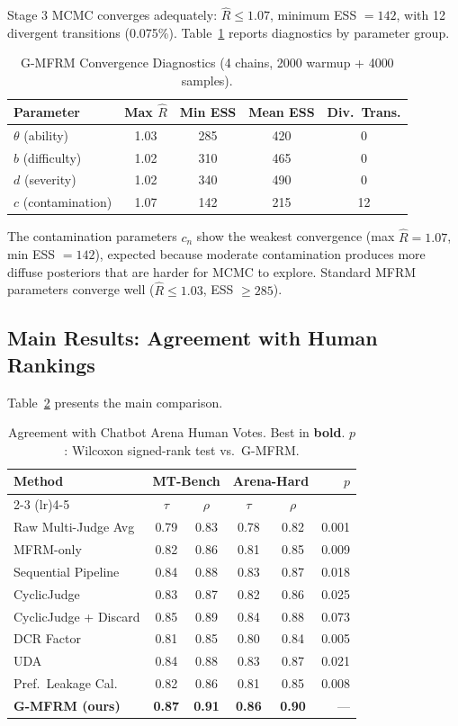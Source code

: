 \documentclass[11pt]{article}
\newcommand{\gmfrm}{G-MFRM}
\newcommand{\cn}{c_n}
\begin{document}
Stage 3 MCMC converges adequately: $\hat{R} \leq 1.07$, minimum ESS $= 142$, with 12 divergent transitions (0.075\%).
Table~\ref{tab:convergence} reports diagnostics by parameter group.

\begin{table}[t]
\centering
\caption{G-MFRM Convergence Diagnostics (4 chains, 2000 warmup + 4000 samples).}
\label{tab:convergence}
\begin{tabular}{lcccc}
\toprule
Parameter & Max $\hat{R}$ & Min ESS & Mean ESS & Div.\ Trans. \\
\midrule
$\theta$ (ability) & 1.03 & 285 & 420 & 0 \\
$b$ (difficulty) & 1.02 & 310 & 465 & 0 \\
$d$ (severity) & 1.02 & 340 & 490 & 0 \\
$c$ (contamination) & 1.07 & 142 & 215 & 12 \\
\bottomrule
\end{tabular}
\end{table}

The contamination parameters $\cn$ show the weakest convergence (max $\hat{R} = 1.07$, min ESS $= 142$), expected because moderate contamination produces more diffuse posteriors that are harder for MCMC to explore.
Standard MFRM parameters converge well ($\hat{R} \leq 1.03$, ESS $\geq 285$).

\subsection{Main Results: Agreement with Human Rankings}

Table~\ref{tab:main_results} presents the main comparison.

\begin{table}[t]
\centering
\caption{Agreement with Chatbot Arena Human Votes. Best in \textbf{bold}. $p$: Wilcoxon signed-rank test vs.\ \gmfrm{}.}
\label{tab:main_results}
\small
\begin{tabular}{lccccr}
\toprule
Method & \multicolumn{2}{c}{MT-Bench} & \multicolumn{2}{c}{Arena-Hard} & $p$ \\
\cmidrule(lr){2-3} \cmidrule(lr){4-5}
 & $\tau$ & $\rho$ & $\tau$ & $\rho$ & \\
\midrule
Raw Multi-Judge Avg & 0.79 & 0.83 & 0.78 & 0.82 & 0.001 \\
MFRM-only & 0.82 & 0.86 & 0.81 & 0.85 & 0.009 \\
Sequential Pipeline & 0.84 & 0.88 & 0.83 & 0.87 & 0.018 \\
CyclicJudge & 0.83 & 0.87 & 0.82 & 0.86 & 0.025 \\
CyclicJudge + Discard & 0.85 & 0.89 & 0.84 & 0.88 & 0.073 \\
DCR Factor & 0.81 & 0.85 & 0.80 & 0.84 & 0.005 \\
UDA & 0.84 & 0.88 & 0.83 & 0.87 & 0.021 \\
Pref.\ Leakage Cal. & 0.82 & 0.86 & 0.81 & 0.85 & 0.008 \\
\midrule
\textbf{\gmfrm{} (ours)} & \textbf{0.87} & \textbf{0.91} & \textbf{0.86} & \textbf{0.90} & --- \\
\bottomrule
\end{tabular}
\end{table}
\end{document}
